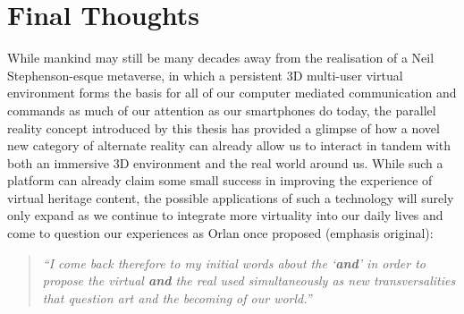 \section{Final Thoughts}

While mankind may still be many decades away from the realisation of a Neil Stephenson-esque metaverse, in which a persistent 3D multi-user virtual environment forms the basis for all of our computer mediated communication and commands as much of our attention as our smartphones do today, the parallel reality concept introduced by this thesis has provided a glimpse of how a novel new category of alternate reality can already allow us to interact in tandem with both an immersive 3D environment and the real world around us. While such a platform can already claim some small success in improving the experience of virtual heritage content, the possible applications of such a technology will surely only expand as we continue to integrate more virtuality into our daily lives and come to question our experiences as Orlan once proposed (emphasis original):

\begin{quote}
	\textit{``I come back therefore to my initial words about the `\textbf{and}' in order to propose the virtual \textbf{and} the real used simultaneously as new transversalities that question art and the becoming of our world.''}~\cite{Orlan2002}
\end{quote}

